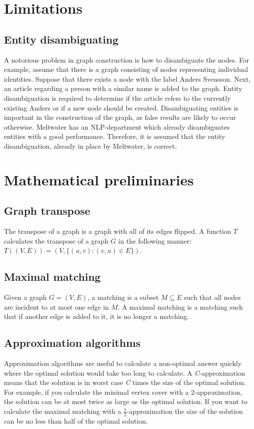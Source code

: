 \section{Limitations}
\subsection{Entity disambiguating}
A notorious problem in graph construction is how to disambiguate the nodes. For example, assume that there is a graph consisting of nodes representing individual identities. Suppose that there exists a node with the label Anders Svensson. Next, an article regarding a person with a similar name is added to the graph. Entity disambiguation is required to determine if the article refers to the currently existing Anders or if a new node should be created. Disambiguating entities is important in the construction of the graph, as false results are likely to occur otherwise. Meltwater has an NLP-department which already disambiguates entities with a good performance. Therefore, it is assumed that the entity disambiguation, already in place by Meltwater, is correct. 

\section{Mathematical preliminaries}

\subsection{Graph transpose}
The transpose of a graph is a graph with all of its edges flipped. A function $T$ calculates the transpose of a graph $G$ in the following manner: $T((V,E)) = (V,\{(u,v) : (v,u) \in E\})$.

\subsection{Maximal matching}
Given a graph $G = (V,E)$, a matching is a subset $M \subseteq E$ such that all nodes are incident to at most one edge in $M$. A maximal matching is a matching such that if another edge is added to it, it is no longer a matching. 

\subsection{Approximation algorithms}
Approximation algorithms are useful to calculate a non-optimal answer quickly where the optimal solution would take too long to calculate. A \textit{C}-approximation means that the solution is in worst case \textit{C} times the size of the optimal solution. For example, if you calculate the minimal vertex cover with a 2-approximation, the solution can be at most twice as large as the optimal solution. If you want to calculate the maximal matching with a $\frac{1}{2}$-approximation the size of the solution can be no less than half of the optimal solution.

